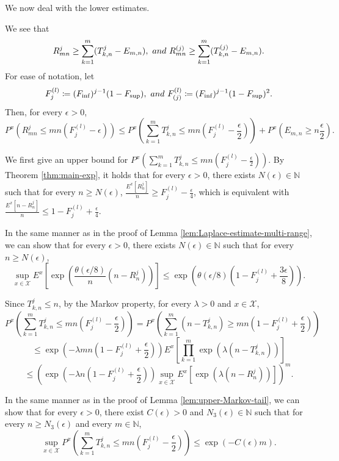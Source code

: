\documentclass[10pt,a4paper]{amsart}
\begin{document}
We now deal with the lower estimates. 

We see that 
\[ R_{mn}^{j} \ge \sum_{k=1}^{m}  (T^{j}_{k,n} - E_{m,n}), \ \textup{ and }  \  R_{mn}^{(j)} \ge \sum_{k=1}^{m} (T^{(j)}_{k,n} - E_{m,n}). \]
For ease of notation, let 
\[ F^{(l)}_{j} \coloneqq (F_{\inf})^{j-1} (1-F_{\sup}), \ \textup{ and }  \ F^{(l)}_{(j)} \coloneqq (F_{\inf})^{j-1} (1-F_{\sup})^2. \]
Then, for every $\epsilon > 0$, 
\[ P^x \left(R_{mn}^{j} \le mn(F_j^{(l)} - \epsilon)\right) \le P^x \left(  \sum_{k=1}^{m}   T^{j}_{k,n} \le mn \left(F_j^{(l)} - \frac{\epsilon}{2} \right) \right) + P^x \left(  E_{m,n} \ge n \frac{\epsilon}{2} \right). \]


We first give an upper bound for  $\displaystyle P^x \left(  \sum_{k=1}^{m}   T^{j}_{k,n} \le mn \left(F_j^{(l)} - \frac{\epsilon}{2} \right) \right)$. 
By Theorem \ref{thm:main-exp}, 
it holds that 
for every $\epsilon > 0$, 
there exists $N(\epsilon) \in \mathbb{N}$ such that 
for every $n \ge N(\epsilon)$, 
$\displaystyle \frac{E^x \left[R_n^j \right] }{n} \ge F_j^{(l)} - \frac{\epsilon}{4}$, which is equivalent with $\displaystyle \frac{E^x \left[n - R_n^j \right] }{n} \le 1 - F_j^{(l)} + \frac{\epsilon}{4}$. 

In the same manner as in the proof of Lemma \ref{lem:Laplace-estimate-multi-range}, 
we can show that 
for every $\epsilon > 0$, there exists  $N(\epsilon) \in \mathbb{N}$ such that 
for every $n \ge N(\epsilon)$, 
\[ \sup_{x \in \mathcal{X}} E^x \left[\exp\left(\frac{\theta(\epsilon/8)}{n} (n-R_n^j) \right) \right] \le \exp\left(\theta(\epsilon/8) \left(1 - F_j^{(l)} + \frac{3\epsilon}{8} \right) \right).\] 


Since $T^{j}_{k,n} \le n$, 
by the Markov property, for every $\lambda > 0$ and $x \in \mathcal{X}$, 
\[  P^x \left(  \sum_{k=1}^{m}   T^{j}_{k,n} \le mn \left(F_j^{(l)} - \frac{\epsilon}{2} \right) \right) = P^x \left(  \sum_{k=1}^{m}   (n-T^{j}_{k,n}) \ge mn \left(1 - F_j^{(l)} + \frac{\epsilon}{2} \right) \right)\]
\[ \le \exp\left(-\lambda mn \left(1 - F_j^{(l)} + \frac{\epsilon}{2} \right) \right) E^x \left[ \prod_{k=1}^{m} \exp\left( \lambda (n-T^{j}_{k,n})  \right)  \right] \]
\[ \le \left( \exp\left(-\lambda n \left(1 - F_j^{(l)} + \frac{\epsilon}{2} \right) \right) \sup_{x \in \mathcal{X}} E^x \left[ \exp\left(\lambda (n-R^j_n) \right) \right] \right)^m. \]

In the same manner as in the proof of Lemma \ref{lem:upper-Markov-tail}, 
we can show that 
for every $\epsilon > 0$, there exist $C(\epsilon) > 0$  and $N_3 (\epsilon) \in \mathbb{N}$ such that 
for every $n \ge N_3 (\epsilon)$ and every $m \in \mathbb{N}$, 
\begin{equation*}
\sup_{x \in \mathcal{X}} P^x \left(  \sum_{k=1}^{m}   T^{j}_{k,n} \le mn \left(F_j^{(l)} - \frac{\epsilon}{2} \right) \right)  \le \exp\left(-C(\epsilon) m \right). 
\end{equation*}
\end{document}
